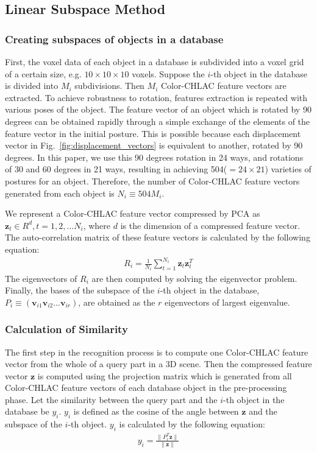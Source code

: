 \documentclass[conference]{sty/IEEEtran}
\begin{document}
\subsection{Linear Subspace Method}
\label{sec:subspace}
\subsubsection{Creating subspaces of objects in a database}
First, the voxel data of each object in a database is subdivided into a voxel grid of a certain size, 
    e.g. $10 \times 10 \times 10$ voxels. 
Suppose the $i$-th object in the database is divided into $M_i$ subdivisions.
Then $M_i$ Color-CHLAC feature vectors are extracted. 
To achieve robustness to rotation, 
    features extraction is repeated with various poses of the object. 
The feature vector of an object which is rotated by 90 degrees can be obtained rapidly
    through a simple exchange of the elements of the feature vector in the initial posture.
This is possible because each displacement vector in Fig.~\ref{fig:displacement_vectors}
    is equivalent to another, rotated by 90 degrees.
In this paper, we use this 90 degrees rotation in 24 ways,
    and rotations of 30 and 60 degrees in 21 ways, 
    resulting in achieving 504($=24 \times 21$) varieties of postures for an object. 
Therefore, the number of Color-CHLAC feature vectors 
    generated from each object is $N_i \equiv 504M_i$. 

We represent a Color-CHLAC feature vector compressed by PCA as $\bm{z}_t \in R^d, t=1,2,...N_i$, 
    where $d$ is the dimension of a compressed feature vector.
The auto-correlation matrix of these feature vectors is calculated by the following equation: 
\begin{eqnarray*}
  R_i = \frac{1}{N_i} \sum^{N_i}_{t=1} \bm{z}_t \bm{z}_t^T
\end{eqnarray*}
The eigenvectors of $R_i$ are then computed by solving the eigenvector problem. 
Finally, the bases of the subspace of the $i$-th object in the database, $P_i \equiv (\bm{v}_{i1} \bm{v}_{i2} ... \bm{v}_{ir})$, 
    are obtained as the $r$ eigenvectors of largest eigenvalue. 

\subsubsection{Calculation of Similarity}
The first step in the recognition process is to compute 
    one Color-CHLAC feature vector from the whole of a query part in a 3D scene. %
Then the compressed feature vector $\bm{z}$ is computed using the projection matrix which is 
    generated from all Color-CHLAC feature vectors of each database object in the pre-processing phase.
Let the similarity between the query part and the $i$-th object in the database be $y_i$. 
$y_i$ is defined as the cosine of the angle between $\bm{z}$ and the subspace of the $i$-th object.
$y_i$ is calculated by the following equation: 
\begin{eqnarray}\label{eq:y_calc}
  y_i = \frac{\| P_i^T \bm{z} \|}{\| \bm{z} \|}
\end{eqnarray}
\end{document}
